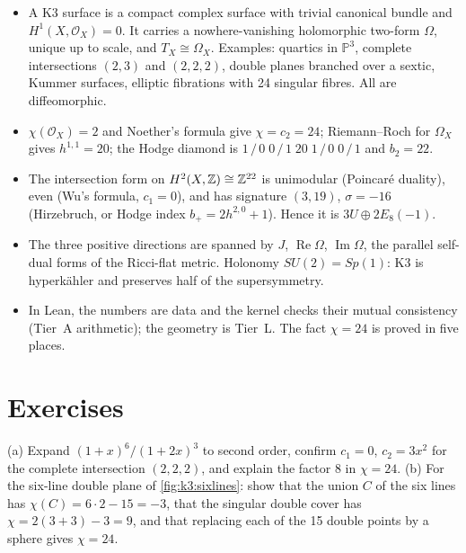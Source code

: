 \begin{summarybox}
\begin{itemize}[leftmargin=*,itemsep=1pt]
\item A K3 surface is a compact complex surface with trivial canonical bundle and
  $H^1(X,\mathcal{O}_X)=0$. It carries a nowhere-vanishing holomorphic two-form $\Omega$,
  unique up to scale, and $T_X\cong\Omega_X$. Examples: quartics in $\mathbb{P}^3$, complete
  intersections $(2,3)$ and $(2,2,2)$, double planes branched over a sextic, Kummer surfaces,
  elliptic fibrations with 24 singular fibres. All are diffeomorphic.
\item $\chi(\mathcal{O}_X)=2$ and Noether's formula give $\chi=c_2=24$; Riemann--Roch for
  $\Omega_X$ gives $h^{1,1}=20$; the Hodge diamond is $1\,/\,0\;0\,/\,1\;20\;1\,/\,0\;0\,/\,1$
  and $b_2=22$.
\item The intersection form on $H^2(X,\mathbb{Z})\cong\mathbb{Z}^{22}$ is unimodular (Poincaré duality), even
  (Wu's formula, $c_1=0$), and has signature $(3,19)$, $\sigma=-16$ (Hirzebruch, or Hodge index
  $b_+=2h^{2,0}+1$). Hence it is $3U\oplus2E_8(-1)$.
\item The three positive directions are spanned by $J$, $\operatorname{Re}\Omega$,
  $\operatorname{Im}\Omega$, the parallel self-dual forms of the Ricci-flat metric. Holonomy
  $SU(2)=Sp(1)$: K3 is hyperkähler and preserves half of the supersymmetry.
\item In Lean, the numbers are data and the kernel checks their mutual consistency (Tier~A
  arithmetic); the geometry is Tier~L. The fact $\chi=24$ is proved in five places.
\end{itemize}
\end{summarybox}

\section*{Exercises}

\begin{exercise}[$\star$]\label{exc:k3:sixlines}
(a) Expand $(1+x)^6/(1+2x)^3$ to second order, confirm $c_1=0$, $c_2=3x^2$ for the complete
intersection $(2,2,2)$, and explain the factor $8$ in $\chi=24$. (b) For the six-line double
plane of \cref{fig:k3:sixlines}: show that the union $C$ of the six lines has
$\chi(C)=6\cdot2-15=-3$, that the singular double cover has $\chi=2(3+3)-3=9$, and that
replacing each of the 15 double points by a sphere gives $\chi=24$.
\end{exercise}

